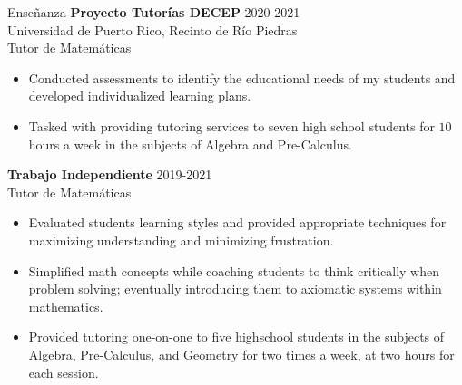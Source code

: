 \documentclass{resume}
\begin{document}
\begin{rSection}{Ense\~nanza}
  \textbf{Proyecto Tutor\'ias DECEP} \hfill{2020-2021} \\
  Universidad de Puerto Rico, Recinto de R\'io Piedras \\
  Tutor de Matem\'aticas
  \begin{itemize}
    \item[] Conducted assessments to identify the educational needs of my
      students and developed individualized learning plans.

    \item[] Tasked with providing tutoring services to seven high school
      students for $10$ hours a week in the subjects of Algebra and
      Pre-Calculus.
  \end{itemize}

  \textbf{Trabajo Independiente} \hfill{2019-2021} \\
  Tutor de Matem\'aticas
  \begin{itemize}
    \item[] Evaluated students learning styles and provided appropriate
      techniques for maximizing understanding and minimizing frustration.

    \item[] Simplified math concepts while coaching students to think
      critically when problem solving; eventually introducing them to
      axiomatic systems within mathematics.

    \item[] Provided tutoring one-on-one to five highschool students in the
      subjects of Algebra, Pre-Calculus, and Geometry for two times a
      week, at two hours for each session.
  \end{itemize}
\end{rSection}
\end{document}
